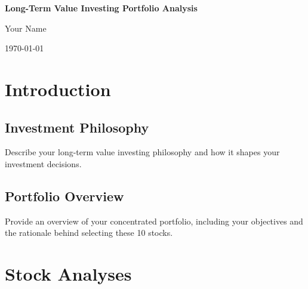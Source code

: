 \documentclass[12pt]{report}
\begin{document}
\begin{titlepage}
    \centering
    \vspace*{2cm}
    {\huge\bfseries Long-Term Value Investing Portfolio Analysis\par}
    \vspace{1.5cm}
    {\Large Your Name\par}
    \vfill
    {\large \today\par}
\end{titlepage}

\begin{abstract}
\noindent
A concise summary of your portfolio analysis, highlighting your investment philosophy, key portfolio components, and expected outcomes.
\end{abstract}

\tableofcontents
\newpage

\chapter{Introduction}
\section{Investment Philosophy}
Describe your long-term value investing philosophy and how it shapes your investment decisions.

\section{Portfolio Overview}
Provide an overview of your concentrated portfolio, including your objectives and the rationale behind selecting these 10 stocks.

\chapter{Stock Analyses}
\end{document}
